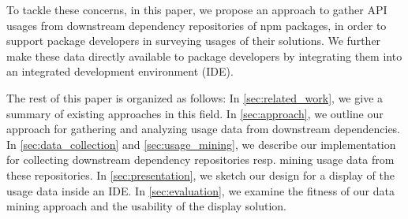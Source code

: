 To tackle these concerns, in this paper, we propose an approach to gather API usages from downstream dependency repositories of npm packages, in order to support package developers in surveying usages of their solutions.
We further make these data directly available to package developers by integrating them into an integrated development environment (IDE).

The rest of this paper is organized as follows:
In \cref{sec:related_work}, we give a summary of existing approaches in this field.
In \cref{sec:approach}, we outline our approach for gathering and analyzing usage data from downstream dependencies.
In \cref{sec:data_collection} and \cref{sec:usage_mining}, we describe our implementation for collecting downstream dependency repositories resp. mining usage data from these repositories.
In \cref{sec:presentation}, we sketch our design for a display of the usage data inside an IDE.
In \cref{sec:evaluation}, we examine the fitness of our data mining approach and the usability of the display solution.
